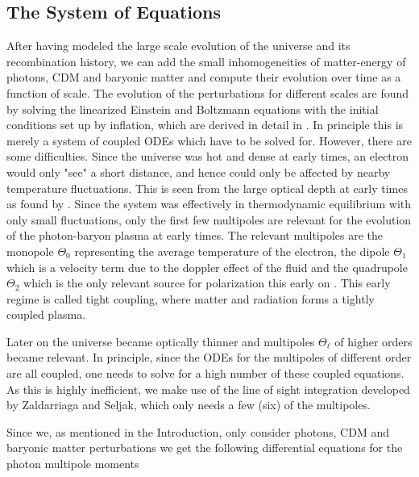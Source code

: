 \documentclass[twocolumn]{aastex62}
\begin{document}
\subsection{The System of Equations} \label{subsec:system}
After having modeled the large scale evolution of the universe and its recombination history, we can add the small inhomogeneities of matter-energy of photons, CDM and baryonic matter and compute their evolution over time as a function of scale. The evolution of the perturbations for different scales are found by solving the linearized Einstein and Boltzmann equations with the initial conditions set up by inflation, which are derived in detail in \cite{dodelson:2003}. In principle this is merely a system of coupled ODEs which have to be solved for. However, there are some difficulties. Since the universe was hot and dense at early times, an electron would only "see" a short distance, and hence could only be affected by nearby temperature fluctuations. This is seen from the large optical depth at early times as found by \cite{stutzer:2020b}. Since the system was effectively in thermodynamic equilibrium with only small fluctuations, only the first few multipoles are relevant for the evolution of the photon-baryon plasma at early times. The relevant multipoles are the monopole $\Theta_0$ representing the average temperature of the electron, the dipole $\Theta_1$ which is a velocity term due to the doppler effect of the fluid and the quadrupole $\Theta_2$ which is the only relevant source for polarization this early on \citep[]{winther:2020b}. This early regime is called tight coupling, where matter and radiation forms a tightly coupled plasma.

Later on the universe became optically thinner and multipoles $\Theta_\ell$ of higher orders became relevant. In principle, since the ODEs for the multipoles of different order are all coupled, one needs to solve for a high number of these coupled equations. As this is highly inefficient, we make use of the line of sight integration developed by Zaldarriaga and Seljak, which only needs a few (six) of the multipoles. 

Since we, as mentioned in the Introduction, only consider photons, CDM and baryonic matter perturbations we get the following differential equations for the photon multipole moments
\end{document}
